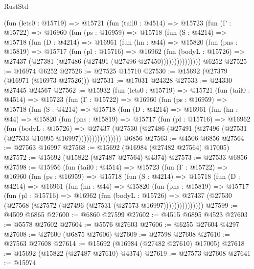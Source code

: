 \begin{lexlean}{RustStd}
\begin{coremodule}
      (fun (lets0 : @15719) =>
      @15721
        (fun (tail0 : @4514) =>
        @15723
          (fun (Γ : @15722) =>
          @16960
            (fun (ps : @16959) =>
            @15718
              (fun (S : @4214) =>
              @15718
                (fun (D : @4214) =>
                @16961
                  (fun (hn : @44) =>
                  @15820
                    (fun (pns : @15819) =>
                    @15717
                      (fun (pl : @15716) =>
                      @16962
                        (fun (bodyL : @15726) =>
                        @27437 (@27381 (@27486 (@27491 (@27496 @27450)))))))))))))))
    @6252
@27525 := @16974 @6252
@27526 := @27525 @15710
@27530 := @15692 (@27379 (@16971 (@16973 @27526)))
@27531 := @17031 @24328
@27533 := @24330 @27445 @24567
@27562 := @15932
    (fun (lets0 : @15719) =>
    @15721
      (fun (tail0 : @4514) =>
      @15723
        (fun (Γ : @15722) =>
        @16960
          (fun (ps : @16959) =>
          @15718
            (fun (S : @4214) =>
            @15718
              (fun (D : @4214) =>
              @16961
                (fun (hn : @44) =>
                @15820
                  (fun (pns : @15819) =>
                  @15717
                    (fun (pl : @15716) =>
                    @16962
                      (fun (bodyL : @15726) =>
                      @27437
                        (@27530
                          (@27486 (@27491 (@27496 (@27531 (@27533 @16995 @16997))))))))))))))))
    @6856
@27563 := @4506 @6856
@27564 := @27563 @16997
@27568 := @15692 (@16984 (@27482 @27564) @17005)
@27572 := @15692 (@15822 (@27487 @27564) @4374)
@27573 := @27533 @6856
@27598 := @15956
    (fun (tail0 : @4514) =>
    @15723
      (fun (Γ : @15722) =>
      @16960
        (fun (ps : @16959) =>
        @15718
          (fun (S : @4214) =>
          @15718
            (fun (D : @4214) =>
            @16961
              (fun (hn : @44) =>
              @15820
                (fun (pns : @15819) =>
                @15717
                  (fun (pl : @15716) =>
                  @16962
                    (fun (bodyL : @15726) =>
                    @27437 (@27530 (@27568 (@27572 (@27496 (@27531 (@27573 @16997)))))))))))))))
@27599 := @4509 @6865
@27600 := @6860 @27599
@27602 := @4515 @6895 @4523
@27603 := @5578 @27602
@27604 := @5576 @27603
@27606 := @6255 @27604 @4297
@27608 := @27600 (@6875 @27606)
@27609 := @27598 @27608
@27610 := @27563 @27608
@27614 := @15692 (@16984 (@27482 @27610) @17005)
@27618 := @15692 (@15822 (@27487 @27610) @4374)
@27619 := @27573 @27608
@27641 := @15974

\end{coremodule}
\end{lexlean}
